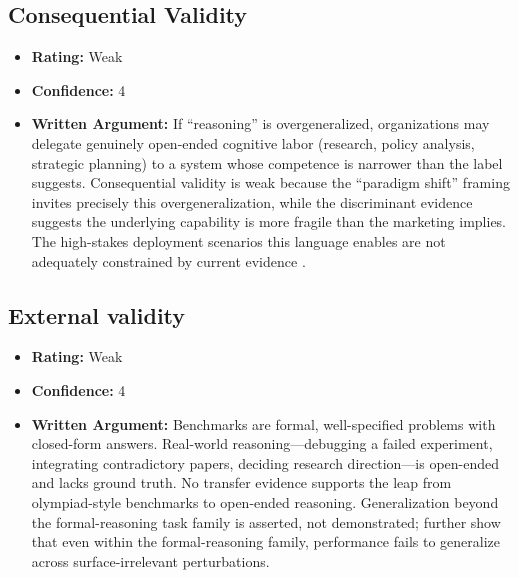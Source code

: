 \subsection{Consequential Validity}
\begin{itemize}
    \item \textbf{Rating:} Weak
    \item \textbf{Confidence:} 4
    \item \textbf{Written Argument:} If ``reasoning'' is overgeneralized, organizations may delegate genuinely open-ended cognitive labor (research, policy analysis, strategic planning) to a system whose competence is narrower than the label suggests. Consequential validity is weak because the ``paradigm shift'' framing invites precisely this overgeneralization, while the discriminant evidence \citep{mirzadeh2025gsm} suggests the underlying capability is more fragile than the marketing implies. The high-stakes deployment scenarios this language enables are not adequately constrained by current evidence \citep{salaudeen2025measurement}.
\end{itemize}

\subsection{External validity}
\begin{itemize}
    \item \textbf{Rating:} Weak
    \item \textbf{Confidence:} 4
    \item \textbf{Written Argument:} Benchmarks are formal, well-specified problems with closed-form answers. Real-world reasoning---debugging a failed experiment, integrating contradictory papers, deciding research direction---is open-ended and lacks ground truth. No transfer evidence supports the leap from olympiad-style benchmarks to open-ended reasoning. Generalization beyond the formal-reasoning task family is asserted, not demonstrated; \citet{mirzadeh2025gsm} further show that even within the formal-reasoning family, performance fails to generalize across surface-irrelevant perturbations.
\end{itemize}

